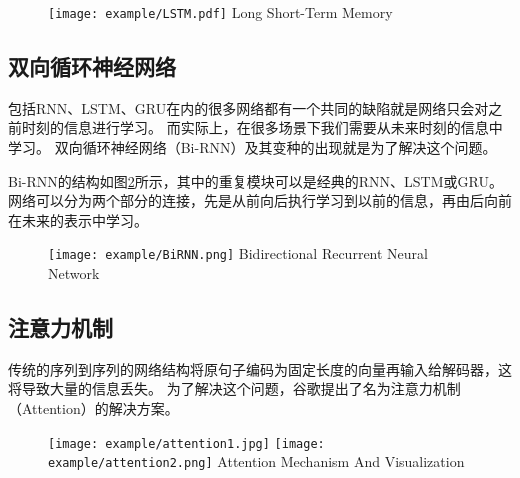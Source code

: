 \begin{figure}[!htp]
  \centering
  \texttt{[image: example/LSTM.pdf]}
    {Long Short-Term Memory}
  \label{fig:LSTM}
\end{figure}

\subsection{双向循环神经网络}

包括RNN、LSTM、GRU在内的很多网络都有一个共同的缺陷就是网络只会对之前时刻的信息进行学习。
而实际上，在很多场景下我们需要从未来时刻的信息中学习。
双向循环神经网络（Bi-RNN）及其变种的出现就是为了解决这个问题。

Bi-RNN的结构如图\ref{fig:BiRNN}所示，其中的重复模块可以是经典的RNN、LSTM或GRU。
网络可以分为两个部分的连接，先是从前向后执行学习到以前的信息，再由后向前在未来的表示中学习。

\begin{figure}[!htp]
  \centering
  \texttt{[image: example/BiRNN.png]}
    {Bidirectional Recurrent Neural Network}
  \label{fig:BiRNN}
\end{figure}

\subsection{注意力机制}

传统的序列到序列的网络结构将原句子编码为固定长度的向量再输入给解码器，这将导致大量的信息丢失。
为了解决这个问题，谷歌提出了名为注意力机制（Attention）的解决方案。

\begin{figure}[htbp]
  \centering
  \texttt{[image: example/attention1.jpg]}
  \texttt{[image: example/attention2.png]}
    {Attention Mechanism And Visualization}
\label{fig:attention}
\end{figure}

